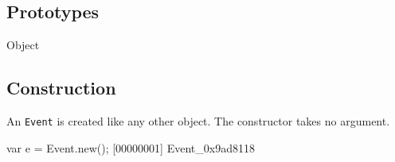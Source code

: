 \subsection{Prototypes}
\begin{refObjects}
\item[Object]
\end{refObjects}

\subsection{Construction}
\label{sec:stdlib:event:ctor}

An \lstinline{Event} is created like any other object.  The constructor
takes no argument.

\begin{urbiscript}[firstnumber=1]
var e = Event.new();
[00000001] Event_0x9ad8118
\end{urbiscript}

